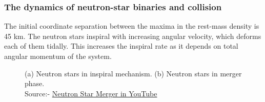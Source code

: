 \subsubsection{The dynamics of neutron-star binaries and collision}

The initial coordinate separation between the maxima in the rest-mass density is 45 km. The neutron stars inspiral with increasing angular velocity, which deforms each of them tidally. This increases the inspiral rate as it depends on total angular momentum of the system. 

\begin{figure}[h]
    \centering
    \qquad
    \caption{(a) Neutron stars in inspiral mechanism. (b) Neutron stars in merger phase.\\ Source:- \href{https://youtu.be/y8VDwGi0r0E}{Neutron Star Merger in YouTube}}
\end{figure}

